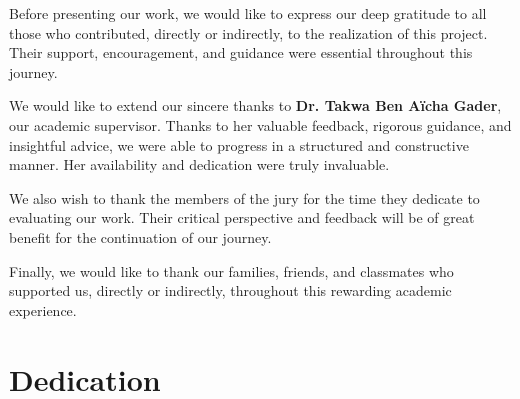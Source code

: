 \documentclass[a4paper,12pt]{report}
\begin{document}
Before presenting our work, we would like to express our deep gratitude to all those who contributed, directly or indirectly, to the realization of this project. Their support, encouragement, and guidance were essential throughout this journey.

We would like to extend our sincere thanks to \textbf{Dr. Takwa Ben Aïcha Gader}, our academic supervisor. Thanks to her valuable feedback, rigorous guidance, and insightful advice, we were able to progress in a structured and constructive manner. Her availability and dedication were truly invaluable.

We also wish to thank the members of the jury for the time they dedicate to evaluating our work. Their critical perspective and feedback will be of great benefit for the continuation of our journey.

Finally, we would like to thank our families, friends, and classmates who supported us, directly or indirectly, throughout this rewarding academic experience.


\chapter*{Dedication}
{}

\thispagestyle{empty}
\end{document}
